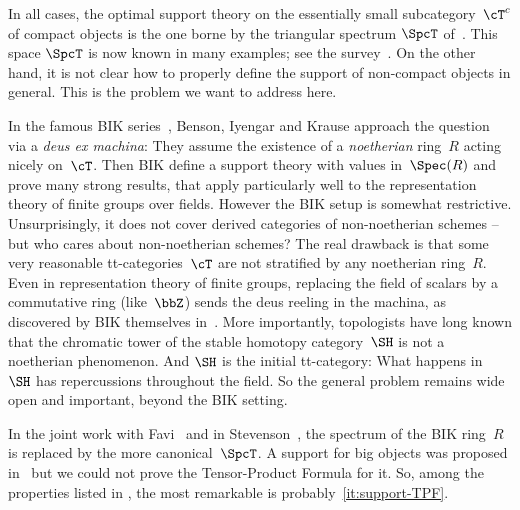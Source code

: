 In all cases, the optimal support theory on the essentially small subcategory~$\cT^c$ of compact objects is the one borne by the triangular spectrum $\SpcT$ of~\cite{Balmer05a}. This space $\SpcT$ is now known in many examples; see the survey~\cite{Balmer19}. On the other hand, it is not clear how to properly define the support of non-compact objects in general. This is the problem we want to address here.

In the famous BIK series~\cite{BensonIyengarKrause08,BensonIyengarKrause11c,BensonIyengarKrause11a,BensonIyengarKrause12a,BensonIyengarKrause12b}, Benson, Iyengar and Krause approach the question via a \textsl{deus ex machina}: They assume the existence of a \emph{noetherian} ring~$R$ acting nicely on~$\cT$. Then BIK define a support theory with values in~$\Spec(R)$ and prove many strong results, that apply particularly well to the representation theory of finite groups over fields. However the BIK setup is somewhat restrictive. Unsurprisingly, it does not cover derived categories of non-noetherian schemes -- but who cares about non-noetherian schemes? The real drawback is that some very reasonable tt-categories~$\cT$ are not stratified by any noetherian ring~$R$. Even in representation theory of finite groups, replacing the field of scalars by a commutative ring (like~$\bbZ$) sends the deus reeling in the machina, as discovered by BIK themselves in~\cite{BensonIyengarKrause13}. More importantly, topologists have long known that the chromatic tower of the stable homotopy category~$\SH$ is not a noetherian phenomenon. And $\SH$ is the initial tt-category: What happens in~$\SH$ has repercussions throughout the field. So the general problem remains wide open and important, beyond the BIK setting.

In the joint work with Favi~\cite{BalmerFavi11} and in Stevenson~\cite{Stevenson13}, the spectrum of the BIK ring~$R$ is replaced by the more canonical~$\SpcT$. A support for big objects was proposed in~\cite{BalmerFavi11} but we could not prove the Tensor-Product Formula for it. So, among the properties listed in , the most remarkable is probably~\eqref{it:support-TPF}.

